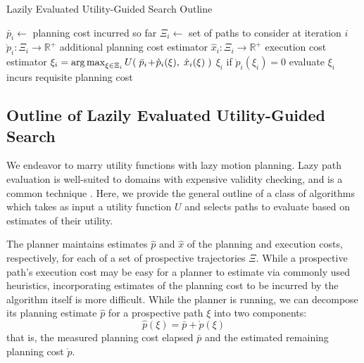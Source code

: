 \begin{algorithm}[t]
\caption{Lazily Evaluated Utility-Guided Search Outline}
\label{alg:utility-search-outline}
\begin{algorithmic}[1]
   \State $\bar{p}_i \leftarrow$
      planning cost incurred so far
   \State $\Xi_i \leftarrow$ set of paths to consider at iteration $i$
   \State $\grave{p}_i : \Xi_i \rightarrow \mathbb{R}^+$
      \Comment additional planning cost estimator
   \State $\hat{x}_i : \Xi_i \rightarrow \mathbb{R}^+$
      \Comment execution cost estimator
   \State $\xi_i = \operatorname*{arg\,max}_{\xi \in \Xi_i}
      U\!\left( \; \bar{p}_i \! + \! \grave{p}_i(\xi), \; \hat{x}_i(\xi) \; \right)$
      \label{line:outline-argmax}
   \State \Return $\xi_i$
      if $\grave{p}_i( \xi_i ) = 0$
   \State evaluate $\xi_i$
      \Comment incurs requisite planning cost
\EndFor
\end{algorithmic}
\end{algorithm}

\subsection{Outline of Lazily Evaluated Utility-Guided Search}

We endeavor to marry utility functions with lazy motion planning.
Lazy path evaluation is well-suited to domains with expensive
validity checking,
and is a common technique \citep{bohlin2000lazyprm, cohen2014narms}.
Here,
we provide the general outline of a class of algorithms which
takes as input a utility function $U$
and selects paths to evaluate based on estimates of their utility.

The planner maintains estimates $\hat{p}$ and $\hat{x}$
of the planning and execution costs, respectively,
for each of a set of prospective trajectories $\Xi$.
While a prospective path's execution cost may be easy for a planner
to estimate via commonly used heuristics,
incorporating estimates of the planning cost
to be incurred by the algorithm itself is more difficult.
While the planner is running,
we can decompose its planning estimate $\hat{p}$ for a prospective
path $\xi$ into two components:
\begin{equation}
   \hat{p}(\xi) = \bar{p} + \grave{p}(\xi)
\end{equation}
that is,
the measured planning cost elapsed $\bar{p}$
and the estimated remaining planning cost $\grave{p}$.

